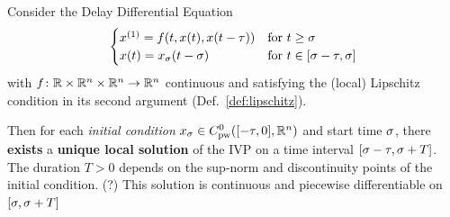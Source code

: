     \begin{theorem}\label{thm:solution-existence}
        Consider the Delay Differential Equation
        \begin{equation}
            \begin{cases}
                \D{x} = f(t,x(t),x(t-\tau)) & \text{for } t\geq\tzero\\
                x(t) = x_\tzero(t-\tzero)   & \text{for } t\in [\tzero-\tau,\tzero]
            \end{cases}
        \end{equation}
        with $f\colon\mathbb{R}\times\mathbb{R}^n\times\mathbb{R}^n\to\mathbb{R}^n$ continuous and satisfying the (local) Lipschitz condition in its second argument (Def.~\ref{def:lipschitz}).


        Then for each \emph{initial condition} $x_{\tzero}\in\statespace[\tau]$ and start time $\sigma$, there \textbf{exists} a \textbf{unique local solution} of the IVP on a time interval $[\sigma-\tau, \sigma+T]$. The duration $T>0$ depends on the sup-norm and discontinuity points of the initial condition. (?)
        This solution is continuous and piecewise differentiable on $[\sigma,\sigma+T]$
    \end{theorem}

